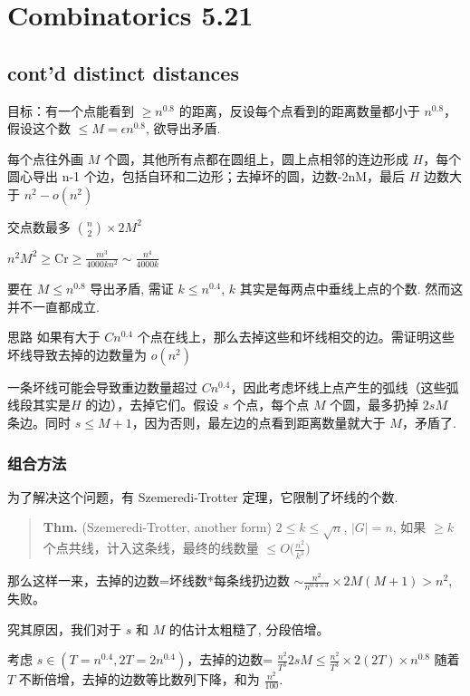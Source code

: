 \chapter{Combinatorics 5.21}
\label{ch:250521}

\section{cont'd distinct distances}

目标：有一个点能看到 $\geq n^{0.8}$ 的距离，反设每个点看到的距离数量都小于 $n^{0.8}$，假设这个数 $\leq M=\epsilon n^{0.8}$, 欲导出矛盾.

每个点往外画 $M$ 个圆，其他所有点都在圆组上，圆上点相邻的连边形成 $H$，每个圆心导出 n-1 个边，包括自环和二边形；去掉坏的圆，边数-2nM，最后 $H$ 边数大于 $n^2-o(n^2)$

交点数最多 ${n\choose 2}\times 2M^2$

$n^2 M^2\geq \text{Cr}\geq\frac{m^3}{4000kn^2}\sim\frac{n^4}{4000k}$

要在 $M\leq n^{0.8}$ 导出矛盾, 需证 $k\leq n^{0.4}$, $k$ 其实是每两点中垂线上点的个数. 然而这并不一直都成立.

思路 如果有大于 $Cn^{0.4}$ 个点在线上，那么去掉这些和坏线相交的边。需证明这些坏线导致去掉的边数量为 $o(n^2)$

一条坏线可能会导致重边数量超过 $Cn^{0.4}$，因此考虑坏线上点产生的弧线（这些弧线段其实是$H$ 的边），去掉它们。假设 $s$ 个点，每个点 $M$ 个圆，最多扔掉 $2sM$ 条边。同时 $s\leq M+1$，因为否则，最左边的点看到距离数量就大于 $M$，矛盾了.

\subsection{组合方法}

为了解决这个问题，有 Szemeredi-Trotter 定理，它限制了坏线的个数.

\begin{quotation}
\textbf{Thm.} (Szemeredi-Trotter, another form) $2\leq k\leq \sqrt{n}$, $|G|=n$, 如果 $\geq k$ 个点共线，计入这条线，最终的线数量 $\leq O\big(\frac{n^2}{k^3}\big)$
\end{quotation}

那么这样一来，去掉的边数=坏线数*每条线扔边数 $\sim\frac{n^2}{n^{0.4\times3}}\times 2M(M+1)>n^2$, 失败。

究其原因，我们对于 $s$ 和 $M$ 的估计太粗糙了, 分段倍增。

考虑 $s\in(T=n^{0.4},2T=2n^{0.4})$，去掉的边数= $\frac{n^2}{T^3}2sM\leq\frac{n^2}{T^3}\times 2(2T)\times n^{0.8}$ 随着 $T$ 不断倍增，去掉的边数等比数列下降，和为 $\frac{n^2}{100}$.

